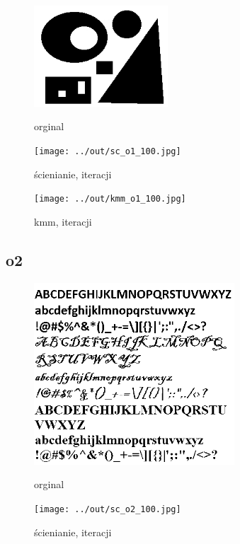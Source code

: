 \documentclass[a4paper,12pt]{article}
\begin{document}
\begin{figure}[h!]
\begin{minipage}[t]{5cm}
\begin{center}
\includegraphics[width=5cm]{../in/o1.jpg}
\caption{orginal}
\end{center}
\end{minipage}
\hfill
\begin{minipage}[t]{5cm}
\begin{center}
\texttt{[image: ../out/sc\_o1\_100.jpg]}
\caption{ścienianie, \protect iteracji}
\end{center}
\end{minipage}
\hfill
\begin{minipage}[t]{5cm}
\begin{center}
\texttt{[image: ../out/kmm\_o1\_100.jpg]}
\caption{kmm, \protect iteracji}
\end{center}
\end{minipage}
\end{figure}



\newpage
\subsection{o2}

\begin{figure}[h!]
\begin{minipage}[t]{7.5cm}
\begin{center}
\includegraphics[width=7.5cm]{../in/o2.jpg}
\caption{orginal}
\end{center}
\end{minipage}
\hfill
\begin{minipage}[t]{7.5cm}
\begin{center}
\texttt{[image: ../out/sc\_o2\_100.jpg]}
\caption{ścienianie, \protect iteracji}
\end{center}
\end{minipage}
\end{figure}
\end{document}

